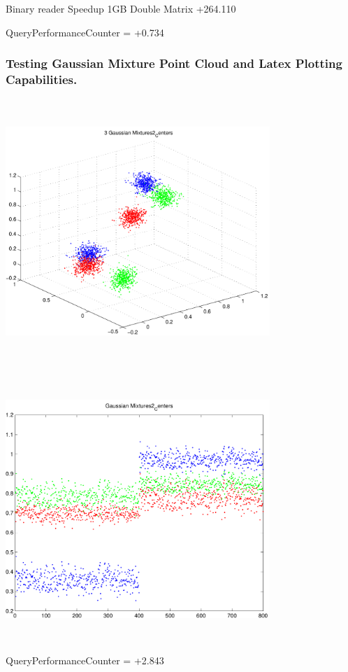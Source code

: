 \documentclass[9pt]{article}
\theoremstyle{plain}
\theoremstyle{definition}
\theoremstyle{remark}
\numberwithin{equation}{section}
\begin{document}
Binary reader Speedup 1GB Double Matrix +264.110

QueryPerformanceCounter  =  +0.734
\subsubsection{Testing Gaussian Mixture Point Cloud and Latex Plotting Capabilities.}
\includegraphics[width=10.0cm,height=10.0cm]{GaussianMixture_Dim_3_Centers2.pdf}

\includegraphics[width=10.0cm,height=10.0cm]{GaussianMixture_Dim_1_Centers2.pdf}

QueryPerformanceCounter  =  +2.843
\end{document}
